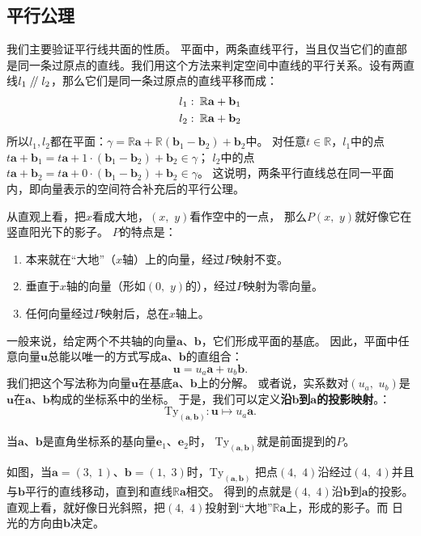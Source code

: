 \documentclass[12pt,UTF8]{ctexbook}
\renewcommand\parallel{\mathrel{/\mskip-4mu/}}
\begin{document}
\begin{appendix}
\section{平行公理}
我们主要验证平行线共面的性质。
平面中，两条直线平行，当且仅当它们的直部是同一条过原点的直线。我们用这个方法来判定空间中直线的平行关系。设有两直线$l_1\parallel l_2$，那么它们是同一条过原点的直线平移而成：
\begin{align}
l_1: & \,\,\, \mathbb{R}\mathbf{a} + \mathbf{b}_1 \notag \\
l_2: & \,\,\, \mathbb{R}\mathbf{a} + \mathbf{b}_2\notag
\end{align}
所以$l_1,l_2$都在平面：$\gamma = \mathbb{R}\mathbf{a} + \mathbb{R}(\mathbf{b}_1 - \mathbf{b}_2) + \mathbf{b}_2$中。
对任意$t\in\mathbb{R}$，$l_1$中的点$t\mathbf{a} + \mathbf{b}_1 = t\mathbf{a} + 1\cdot(\mathbf{b}_1 - \mathbf{b}_2) + \mathbf{b}_2 \in \gamma$；
$l_2$中的点$t\mathbf{a} + \mathbf{b}_2 = t\mathbf{a} + 0\cdot(\mathbf{b}_1 - \mathbf{b}_2) + \mathbf{b}_2 \in \gamma$。
这说明，两条平行直线总在同一平面内，即向量表示的空间符合补充后的平行公理。

\end{appendix}



从直观上看，把$x$看成大地，$(x,\,\,y)$看作空中的一点，
那么$P(x,\,\, y)$就好像它在竖直阳光下的影子。
$P$的特点是：
\begin{enumerate}
    \item 本来就在“大地”（$x$轴）上的向量，经过$P$映射不变。
    \item 垂直于$x$轴的向量（形如$(0,\,\,y)$的），经过$P$映射为零向量。
    \item 任何向量经过$P$映射后，总在$x$轴上。
\end{enumerate}

一般来说，给定两个不共轴的向量$\mathbf{a}$、$\mathbf{b}$，它们形成平面的基底。
因此，平面中任意向量$\mathbf{u}$总能以唯一的方式写成$\mathbf{a}$、$\mathbf{b}$的直组合：
$$ \mathbf{u} = u_a \mathbf{a} + u_b \mathbf{b}.$$
我们把这个写法称为向量$\mathbf{u}$在基底$\mathbf{a}$、$\mathbf{b}$上的分解。
或者说，实系数对$(u_a,\,\, u_b)$是$\mathbf{u}$在$\mathbf{a}$、$\mathbf{b}$构成的坐标系中的坐标。
于是，我们可以定义\textbf{沿}$\mathbf{b}$\textbf{到}$\mathbf{a}$\textbf{的投影映射}。：
$$ \mathrm{Ty}_{(\mathbf{a},\mathbf{b})} : \mathbf{u} \mapsto u_a \mathbf{a}.$$

当$\mathbf{a}$、$\mathbf{b}$是直角坐标系的基向量$\mathbf{e}_1$、$\mathbf{e}_2$时，
$\mathrm{Ty}_{(\mathbf{a},\mathbf{b})}$就是前面提到的$P$。

如图，当$\mathbf{a}=(3,\,\,1)$、$\mathbf{b}=(1,\,\,3)$时，$\mathrm{Ty}_{(\mathbf{a},\mathbf{b})}$
把点$(4,\,\,4)$沿经过$(4,\,\,4)$并且与$\mathbf{b}$平行的直线移动，直到和直线$\mathbb{R}\mathbf{a}$相交。
得到的点就是$(4,\,\,4)$沿$\mathbf{b}$到$\mathbf{a}$的投影。
直观上看，就好像日光斜照，把$(4,\,\,4)$投射到“大地”$\mathbb{R}\mathbf{a}$上，形成的影子。而
日光的方向由$\mathbf{b}$决定。
\end{document}
